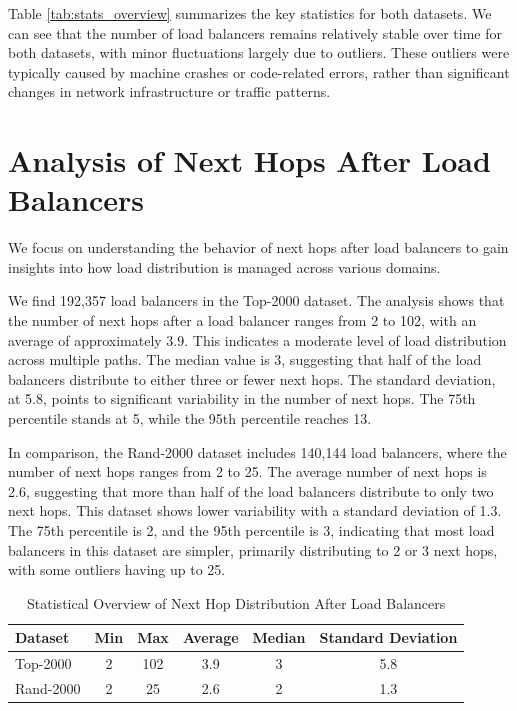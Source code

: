 \documentclass[12pt]{cwru_thesis}
\begin{document}
Table \ref{tab:stats_overview} summarizes the key statistics for both datasets. We can see that the number of load balancers remains relatively stable over time for both datasets, with minor fluctuations largely due to outliers. These outliers were typically caused by machine crashes or code-related errors, rather than significant changes in network infrastructure or traffic patterns.













\section{Analysis of Next Hops After Load Balancers}

We focus on understanding the behavior of next hops after load balancers to gain insights into how load distribution is managed across various domains. 

We find 192,357 load balancers in the Top-2000 dataset. The analysis shows that the number of next hops after a load balancer ranges from 2 to 102, with an average of approximately 3.9. This indicates a moderate level of load distribution across multiple paths. The median value is 3, suggesting that half of the load balancers distribute to either three or fewer next hops. The standard deviation, at 5.8, points to significant variability in the number of next hops. The 75th percentile stands at 5, while the 95th percentile reaches 13.

In comparison, the Rand-2000 dataset includes 140,144 load balancers, where the number of next hops ranges from 2 to 25. The average number of next hops is 2.6, suggesting that more than half of the load balancers distribute to only two next hops. This dataset shows lower variability with a standard deviation of 1.3. The 75th percentile is 2, and the 95th percentile is 3, indicating that most load balancers in this dataset are simpler, primarily distributing to 2 or 3 next hops, with some outliers having up to 25.

\begin{table}[h]
\centering
\begin{tabular}{|l|c|c|c|c|c|}
\hline
\textbf{Dataset} & \textbf{Min} & \textbf{Max} & \textbf{Average} & \textbf{Median} & \textbf{Standard Deviation} \\
\hline
Top-2000 & 2 & 102 & 3.9 & 3 & 5.8 \\
Rand-2000 & 2 & 25 & 2.6 & 2 & 1.3 \\
\hline
\end{tabular}
\caption{Statistical Overview of Next Hop Distribution After Load Balancers}
\label{tab:next_hop_stats}
\end{table}
\end{document}
